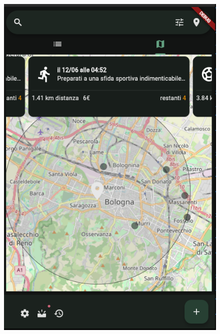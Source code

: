 \documentclass[a4paper,12pt]{article}
\begin{document}
\begin{figure}[h]
    \begin{minipage}{0.32\textwidth}
        \centering
        \label{fig:search:map}
        \includegraphics[width=1\linewidth]{img/search_map_page.png}
    \end{minipage}
    \begin{minipage}{0.32\textwidth}
        \centering
        \label{fig:filter}

\end{minipage}
\end{figure}
\end{document}
